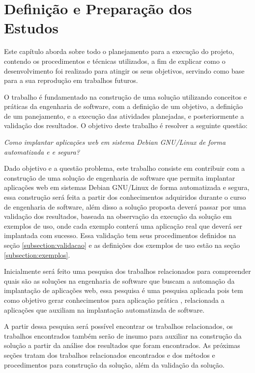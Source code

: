 \chapter{Definição e Preparação dos Estudos}

\label{cap-metodologia}
Este capítulo aborda sobre todo o planejamento para a execução do projeto,
contendo os procedimentos e técnicas utilizados, a fim de
explicar como o desenvolvimento foi realizado para atingir os seus objetivos,
servindo como base para a sua reprodução em trabalhos futuros.

O trabalho é fundamentado na construção de uma solução utilizando conceitos e práticas
da engenharia de software, com a definição de um objetivo, a definição de um panejamento,
e a execução das atividades planejadas, e posteriormente a validação dos resultados.
O objetivo deste trabalho é resolver a seguinte questão:

\begin{center}
  \textit{
  Como implantar aplicações web em sistema Debian GNU/Linux de forma automatizada e
  e segura?
}
\end{center}

Dado objetivo e a questão problema, este trabalho consiste em contribuir
com a construção de uma solução de engenharia de software que permita implantar
aplicações web em sistemas Debian GNU/Linux de forma automatizada e segura, essa
construção será feita a partir dos conhecimentos adquiridos durante
o curso de engenharia de software, além disso a solução proposta deverá passar
por uma validação dos resultados, baseada na observação
da execução da solução em exemplos de uso, onde cada exemplo conterá uma aplicação
real que deverá ser implantada com sucesso. Essa validação tem seus procedimentos
definidos na seção \ref{subsection:validacao} e as definições dos exemplos de uso
estão na seção \ref{subsection:exemplos}.

Inicialmente será feito uma pesquisa dos trabalhos relacionados para compreender
quais são as soluções na engenharia de software que buscam a automação da implantação
de aplicações web, essa pesquisa é uma pesquisa aplicada pois tem como objetivo
gerar conhecimentos para aplicação prática \cite{gerhardt2009metodos},
relacionada a aplicações que auxiliam na implantação automatizada de software.

A partir dessa pesquisa será possível encontrar os trabalhos relacionados, os
trabalhos encontrados também serão de insumo para auxiliar na construção da 
solução a partir da análise dos resultados que foram encontrados. As próximas 
seções tratam dos trabalhos relacionados encontrados e dos métodos e
procedimentos para construção da solução, além da validação da solução.


